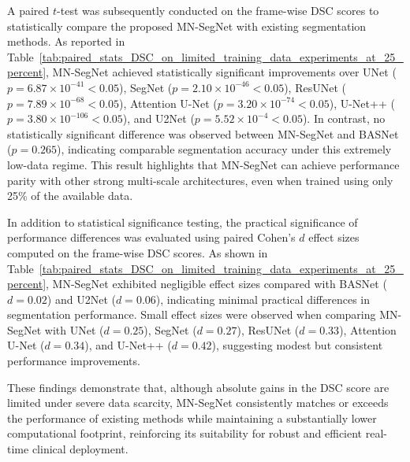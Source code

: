 \documentclass[12pt,letterpaper]{article}
\begin{document}
A paired $t$-test was subsequently conducted on the frame-wise DSC scores to statistically compare the proposed MN-SegNet with existing segmentation methods. As reported in Table~\ref{tab:paired_stats_DSC_on_limited_training_data_experiments_at_25_percent}, MN-SegNet achieved statistically significant improvements over UNet ($p = 6.87 \times 10^{-41}< 0.05$), SegNet ($p = 2.10 \times 10^{-46}< 0.05$), ResUNet ($p = 7.89 \times 10^{-68}< 0.05$), Attention U-Net ($p = 3.20 \times 10^{-74}< 0.05$), U-Net++ ($p = 3.80 \times 10^{-106}< 0.05$), and U2Net ($p = 5.52 \times 10^{-4}< 0.05$). In contrast, no statistically significant difference was observed between MN-SegNet and BASNet ($p = 0.265$), indicating comparable segmentation accuracy under this extremely low-data regime. This result highlights that MN-SegNet can achieve performance parity with other strong multi-scale architectures, even when trained using only 25\% of the available data.

In addition to statistical significance testing, the practical significance of performance differences was evaluated using paired Cohen’s $d$ effect sizes computed on the frame-wise DSC scores. As shown in Table~\ref{tab:paired_stats_DSC_on_limited_training_data_experiments_at_25_percent}, MN-SegNet exhibited negligible effect sizes compared with BASNet ($d = 0.02$) and U2Net ($d = 0.06$), indicating minimal practical differences in segmentation performance. Small effect sizes were observed when comparing MN-SegNet with UNet ($d = 0.25$), SegNet ($d = 0.27$), ResUNet ($d = 0.33$), Attention U-Net ($d = 0.34$), and U-Net++ ($d = 0.42$), suggesting modest but consistent performance improvements. 

These findings demonstrate that, although absolute gains in the DSC score are limited under severe data scarcity, MN-SegNet consistently matches or exceeds the performance of existing methods while maintaining a substantially lower computational footprint, reinforcing its suitability for robust and efficient real-time clinical deployment.


 
\end{document}
